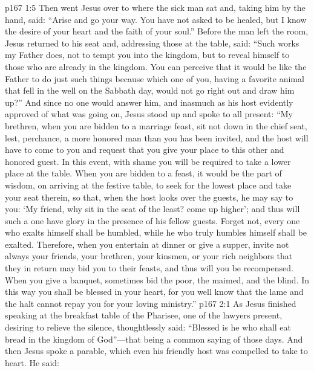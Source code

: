 \pc \vs p167 1:5 Then went Jesus over to where the sick man sat and, taking him by the hand, said: \textcolor{ubdarkred}{“Arise and go your way. You have not asked to be healed, but I know the desire of your heart and the faith of your soul.”} Before the man left the room, Jesus returned to his seat and, addressing those at the table, said: \textcolor{ubdarkred}{“Such works my Father does, not to tempt you into the kingdom, but to reveal himself to those who are already in the kingdom. You can perceive that it would be like the Father to do just such things because which one of you, having a favorite animal that fell in the well on the Sabbath day, would not go right out and draw him up?”} And since no one would answer him, and inasmuch as his host evidently approved of what was going on, Jesus stood up and spoke to all present: \textcolor{ubdarkred}{“My brethren, when you are bidden to a marriage feast, sit not down in the chief seat, lest, perchance, a more honored man than you has been invited, and the host will have to come to you and request that you give your place to this other and honored guest. In this event, with shame you will be required to take a lower place at the table. When you are bidden to a feast, it would be the part of wisdom, on arriving at the festive table, to seek for the lowest place and take your seat therein, so that, when the host looks over the guests, he may say to you: ‘My friend, why sit in the seat of the least? come up higher’; and thus will such a one have glory in the presence of his fellow guests. Forget not, every one who exalts himself shall be humbled, while he who truly humbles himself shall be exalted. Therefore, when you entertain at dinner or give a supper, invite not always your friends, your brethren, your kinsmen, or your rich neighbors that they in return may bid you to their feasts, and thus will you be recompensed. When you give a banquet, sometimes bid the poor, the maimed, and the blind. In this way you shall be blessed in your heart, for you well know that the lame and the halt cannot repay you for your loving ministry.”}\plusone
{}
\vs p167 2:1 As Jesus finished speaking at the breakfast table of the Pharisee, one of the lawyers present, desiring to relieve the silence, thoughtlessly said: “Blessed is he who shall eat bread in the kingdom of God”---that being a common saying of those days. And then Jesus spoke a parable, which even his friendly host was compelled to take to heart. He said:
